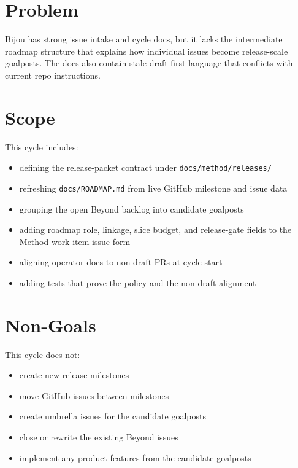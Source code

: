 \section{Problem}\label{record-212-problem}

Bijou has strong issue intake and cycle docs, but it lacks the intermediate roadmap structure that explains how individual issues become release-scale goalposts. The docs also contain stale draft-first language that conflicts with current repo instructions.

\section{Scope}\label{record-212-scope}

This cycle includes:

\begin{itemize}
\tightlist
\item
  defining the release-packet contract under \texttt{d\allowbreak{}o\allowbreak{}c\allowbreak{}s\allowbreak{}/\allowbreak{}m\allowbreak{}e\allowbreak{}t\allowbreak{}h\allowbreak{}o\allowbreak{}d\allowbreak{}/\allowbreak{}r\allowbreak{}e\allowbreak{}l\allowbreak{}e\allowbreak{}a\allowbreak{}s\allowbreak{}e\allowbreak{}s\allowbreak{}/}
\item
  refreshing \texttt{d\allowbreak{}o\allowbreak{}c\allowbreak{}s\allowbreak{}/\allowbreak{}R\allowbreak{}O\allowbreak{}A\allowbreak{}D\allowbreak{}M\allowbreak{}A\allowbreak{}P\allowbreak{}.\allowbreak{}m\allowbreak{}d} from live GitHub milestone and issue data
\item
  grouping the open Beyond backlog into candidate goalposts
\item
  adding roadmap role, linkage, slice budget, and release-gate fields to the Method work-item issue form
\item
  aligning operator docs to non-draft PRs at cycle start
\item
  adding tests that prove the policy and the non-draft alignment
\end{itemize}

\section{Non-Goals}\label{record-212-non-goals}

This cycle does not:

\begin{itemize}
\tightlist
\item
  create new release milestones
\item
  move GitHub issues between milestones
\item
  create umbrella issues for the candidate goalposts
\item
  close or rewrite the existing Beyond issues
\item
  implement any product features from the candidate goalposts
\end{itemize}

